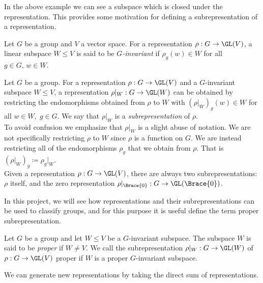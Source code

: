 \documentclass[../Project.tex]{subfiles}
\begin{document}
In the above example we can see a subspace which is closed under the representation. This provides some motivation for defining a subrepresentation of a representation.

\begin{defi}
	Let $G$ be a group and $V$ a vector space. For a representation $\rho : G \to \GL(V)$, a linear subspace $W \leqslant V$ is said to be \textit{$G$-invariant} if $\rho_g(w) \in W$ for all $g \in G,\, w \in W$.
\end{defi}

\begin{defi}
	Let $G$ be a group. For a representation $\rho : G \to \GL(V)$ and a $G$-invariant subspace $W \leqslant V$, a representation $\rho\vert_W : G \to \GL(W)$ can be obtained by restricting the endomorphisms obtained from $\rho$ to $W$ with $(\rho\vert_W)_g(w) \in W$ for all $w \in W,\;g \in G$. We say that $\rho\vert_W$ is a \textit{subrepresentation} of $\rho$.\\

	To avoid confusion we emphasize that $\rho\vert_W$ is a slight abuse of notation. We are not specifically restricting $\rho$ to $W$ since $\rho$ is a function on $G$. We are instead restricting all of the endomorphisms $\rho_g$ that we obtain from $\rho$. That is $(\rho\vert_W)_g \coloneqq \rho_g\vert_W$.\\

	Given a representation $\rho : G \to \GL(V)$, there are always two subrepresentations: $\rho$ itself, and the zero representation $\rho\vert_\Brace{0} : G \to \GL(\Brace{0})$.\\
\end{defi}

In this project, we will see how representations and their subrepresentations can be used to classify groups, and for this purpose it is useful define the term proper subrepresentation.

\begin{defi}
	Let $G$ be a group and let $W \leqslant V$ be a $G$-invariant subspace. The subspace $W$ is said to be \textit{proper} if $W \neq V$.  We call the subrepresentation $\rho\vert_{W} : G \to \GL(W)$ of $\rho : G \to \GL(V)$ proper if $W$ is a proper $G$-invariant subspace.\\
\end{defi}

We can generate new representations by taking the direct sum of representations.
\end{document}
